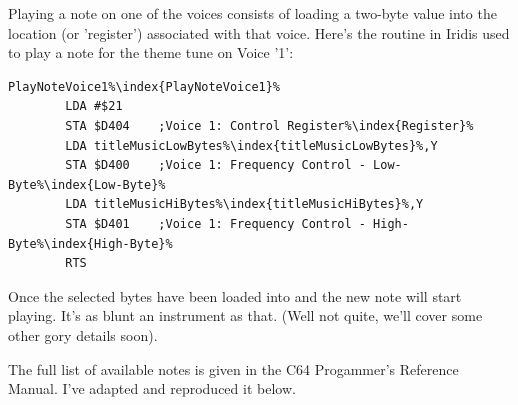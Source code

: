 Playing a note on one of the voices consists of loading a two-byte value into the location
(or 'register') associated with that voice. Here's the routine in Iridis used to play a note
for the theme tune on Voice '1':

\begin{lstlisting}[escapechar=\%,caption=Plays a note on Voice 1. The routine\index{routine} is supplied with a value in Y
that indexes into two arrays\ containing the first (Hi) and second (Lo) byte respectively\ associated with the selected note.]
PlayNoteVoice1%\index{PlayNoteVoice1}%
        LDA #$21
        STA $D404    ;Voice 1: Control Register%\index{Register}%
        LDA titleMusicLowBytes%\index{titleMusicLowBytes}%,Y
        STA $D400    ;Voice 1: Frequency Control - Low-Byte%\index{Low-Byte}%
        LDA titleMusicHiBytes%\index{titleMusicHiBytes}%,Y
        STA $D401    ;Voice 1: Frequency Control - High-Byte%\index{High-Byte}%
        RTS
\end{lstlisting}

Once the selected bytes have been loaded into  and  the new note will start playing. 
It's as blunt an instrument as that. (Well not quite, we'll cover some other gory details soon). 

The full list of available notes is given in the C64 Progammer's Reference Manual. I've adapted and reproduced it below.

